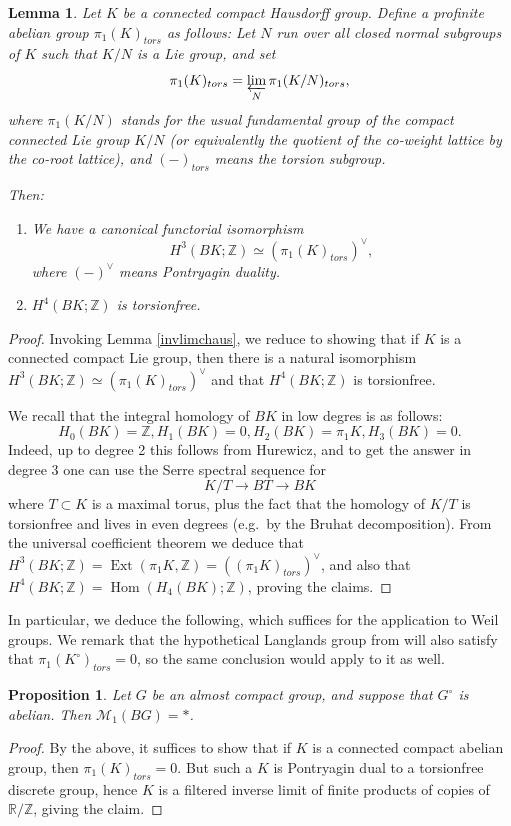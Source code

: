 \documentclass[12pt]{article}
\newtheorem{lemma}[theorem]{Lemma}
\newtheorem{proposition}[theorem]{Proposition}
\theoremstyle{definition}
\newcommand{\on}{\operatorname}
\newcommand{\mc}{\mathcal}
\newcommand{\mbb}{\mathbb}
\begin{document}
\begin{lemma}\label{compactliegrouplemma}
Let $K$ be a connected compact Hausdorff group.  Define a profinite abelian group $\pi_1(K)_{tors}$ as follows: Let $N$ run over all closed normal subgroups of $K$ such that $K/N$ is a Lie group, and set
$$\pi_1(K)_{tors} = \varprojlim_N \pi_1(K/N)_{tors},$$
where $\pi_1(K/N)$ stands for the usual fundamental group of the compact connected Lie group $K/N$ (or equivalently the quotient of the co-weight lattice by the co-root lattice), and $(-)_{tors}$ means the torsion subgroup.

Then:
\begin{enumerate}
\item We have a canonical functorial isomorphism $$H^3(BK;\mbb{Z})\simeq (\pi_1(K)_{tors})^\vee,$$
where $(-)^\vee$ means Pontryagin duality.
\item $H^4(BK;\mbb{Z})$ is torsionfree.
\end{enumerate}
\end{lemma}
\begin{proof}

Invoking Lemma \ref{invlimchaus}, we reduce to showing that if $K$ is a connected compact Lie group, then there is a natural isomorphism $H^3(BK;\mbb{Z})\simeq (\pi_1(K)_{tors})^\vee$
and that
$H^4(BK;\mbb{Z})$
is torsionfree.

We recall that the integral homology of $BK$ in low degres is as follows:
$$H_0(BK)=\mbb{Z}, H_1(BK)=0, H_2(BK)=\pi_1K, H_3(BK)=0.$$
Indeed, up to degree 2 this follows from Hurewicz, and to get the answer in degree 3 one can use the Serre spectral sequence for
$$K/T \to BT \to BK$$
where $T\subset K$ is a maximal torus, plus the fact that the homology of $K/T$ is torsionfree and lives in even degrees (e.g.\ by the Bruhat decomposition).  From the universal coefficient theorem we deduce that $H^3(BK; \mbb{Z})= \on{Ext}(\pi_1K,\mbb{Z})=((\pi_1K)_{tors})^\vee$, and also that $H^4(BK;\mbb{Z})= \on{Hom}(H_4(BK);\mbb{Z})$, proving the claims.
\end{proof}

In particular, we deduce the following, which suffices for the application to Weil groups.  We remark that the hypothetical Langlands group from \cite{arthur} will also satisfy that $\pi_1(K^\circ)_{tors}=0$, so the same conclusion would apply to it as well.

\begin{proposition}\label{moore1ab}
Let $G$ be an almost compact group, and suppose that $G^\circ$ is abelian.  Then $\mc{M}_1(BG)=\ast$.
\end{proposition}
\begin{proof}
By the above, it suffices to show that if $K$ is a connected compact abelian group, then $\pi_1(K)_{tors}=0$.  But such a $K$ is Pontryagin dual to a torsionfree discrete group, hence $K$ is a filtered inverse limit of finite products of copies of $\mbb{R}/\mbb{Z}$, giving the claim.
\end{proof}
\end{document}
